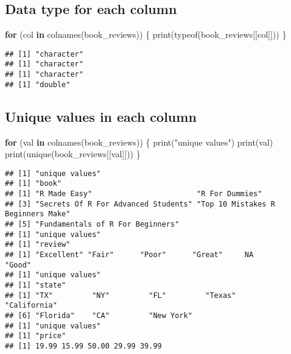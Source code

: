 \documentclass[
]{article}
\newenvironment{Shaded}{\begin{snugshade}}{\end{snugshade}}
\newcommand{\ControlFlowTok}[1]{\textcolor[rgb]{0.13,0.29,0.53}{\textbf{#1}}}
\newcommand{\FunctionTok}[1]{\textcolor[rgb]{0.00,0.00,0.00}{#1}}
\newcommand{\NormalTok}[1]{#1}
\newcommand{\StringTok}[1]{\textcolor[rgb]{0.31,0.60,0.02}{#1}}
\begin{document}
\hypertarget{data-type-for-each-column}{%
\subsection{Data type for each column}\label{data-type-for-each-column}}

\begin{Shaded}
\begin{Highlighting}[]
\ControlFlowTok{for}\NormalTok{ (col }\ControlFlowTok{in} \FunctionTok{colnames}\NormalTok{(book\_reviews)) \{}
 \FunctionTok{print}\NormalTok{(}\FunctionTok{typeof}\NormalTok{(book\_reviews[[col]]))}
\NormalTok{\}}
\end{Highlighting}
\end{Shaded}

\begin{verbatim}
## [1] "character"
## [1] "character"
## [1] "character"
## [1] "double"
\end{verbatim}

\hypertarget{unique-values-in-each-column}{%
\subsection{Unique values in each
column}\label{unique-values-in-each-column}}

\begin{Shaded}
\begin{Highlighting}[]
\ControlFlowTok{for}\NormalTok{ (val }\ControlFlowTok{in} \FunctionTok{colnames}\NormalTok{(book\_reviews)) \{}
  \FunctionTok{print}\NormalTok{(}\StringTok{"unique values"}\NormalTok{)}
  \FunctionTok{print}\NormalTok{(val)}
  \FunctionTok{print}\NormalTok{(}\FunctionTok{unique}\NormalTok{(book\_reviews[[val]]))}
\NormalTok{\}}
\end{Highlighting}
\end{Shaded}

\begin{verbatim}
## [1] "unique values"
## [1] "book"
## [1] "R Made Easy"                        "R For Dummies"                     
## [3] "Secrets Of R For Advanced Students" "Top 10 Mistakes R Beginners Make"  
## [5] "Fundamentals of R For Beginners"   
## [1] "unique values"
## [1] "review"
## [1] "Excellent" "Fair"      "Poor"      "Great"     NA          "Good"     
## [1] "unique values"
## [1] "state"
## [1] "TX"         "NY"         "FL"         "Texas"      "California"
## [6] "Florida"    "CA"         "New York"  
## [1] "unique values"
## [1] "price"
## [1] 19.99 15.99 50.00 29.99 39.99
\end{verbatim}
\end{document}
